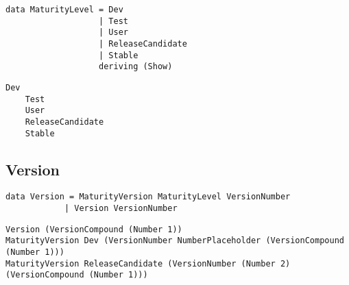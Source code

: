 \documentclass[11pt]{article}
\begin{document}


%
%
\begin{lstlisting}[style=Haskell]
data MaturityLevel = Dev
                   | Test
                   | User
                   | ReleaseCandidate
                   | Stable
                   deriving (Show)
\end{lstlisting}

\begin{lstlisting}[style=Examples]
	Dev
	Test
	User
	ReleaseCandidate
	Stable
\end{lstlisting}

\subsection{Version}


\begin{lstlisting}[style=Haskell]
data Version = MaturityVersion MaturityLevel VersionNumber  
			| Version VersionNumber
\end{lstlisting}

\begin{lstlisting}[style=Examples]
Version (VersionCompound (Number 1))
MaturityVersion Dev (VersionNumber NumberPlaceholder (VersionCompound (Number 1)))
MaturityVersion ReleaseCandidate (VersionNumber (Number 2) (VersionCompound (Number 1)))
\end{lstlisting}
\end{document}
